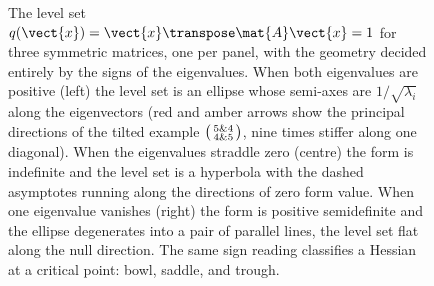 \begin{figure}[htbp]
\caption[Level sets of quadratic forms by eigenvalue sign]{The level
set $q(\vect{x}) = \vect{x}\transpose\mat{A}\vect{x} = 1$ for three
symmetric matrices, one per panel, with the geometry decided entirely
by the signs of the eigenvalues. When both eigenvalues are positive
(left) the level set is an ellipse whose semi-axes are
$1/\sqrt{\lambda_i}$ along the eigenvectors (red and amber arrows show
the principal directions of the tilted example
$\protect\begin{psmallmatrix}5\&4\\4\&5\protect\end{psmallmatrix}$,
nine times stiffer along one diagonal). When the eigenvalues straddle
zero (centre) the form is indefinite and the level set is a hyperbola
with the dashed asymptotes running along the directions of zero form
value. When one eigenvalue vanishes (right) the form is positive
semidefinite and the ellipse degenerates into a pair of parallel
lines, the level set flat along the null direction. The same sign
reading classifies a Hessian at a critical point: bowl, saddle, and
trough.}
\label{fig:vol02:ch10:quadratic-conics}
\end{figure}
